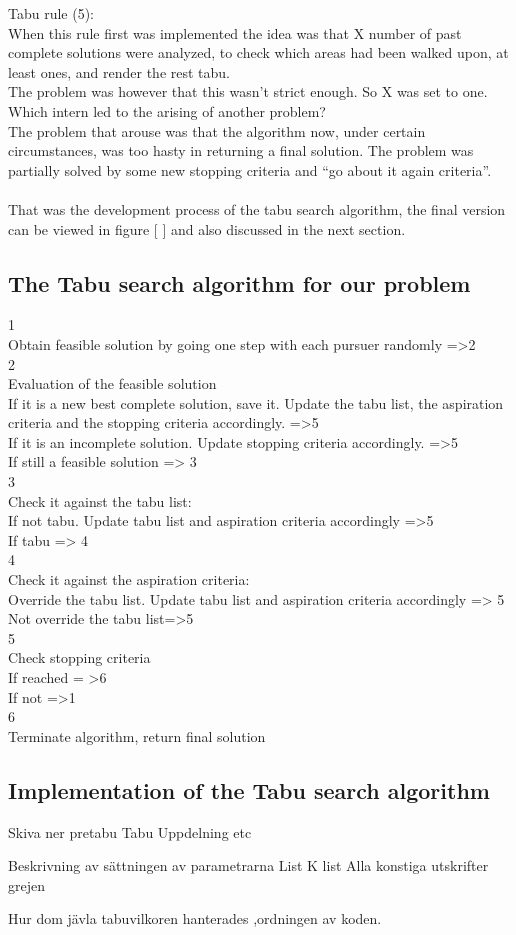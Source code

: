 Tabu rule (5):\\
When this rule first was implemented the idea was that X number of past complete solutions were analyzed, to check which areas had been walked upon, at least ones, and render the rest tabu.\\
The problem was however that this wasn’t strict enough. So X was set to one. Which intern led to the arising of another problem?\\
The problem that arouse was that the algorithm now, under certain circumstances, was too hasty in returning a final solution.
The problem was partially solved by some new stopping criteria and “go about it again criteria”.\\
\\
That was the development process of the tabu search algorithm, the final version can be viewed in figure [ ] and also discussed in the next section.\\


\subsection{The Tabu search algorithm for our problem}


1\\
Obtain feasible solution by going one step with each pursuer randomly =>2\\
2\\
Evaluation of the feasible solution\\
If it is a new best complete solution, save it. Update the tabu list, the aspiration criteria and the stopping criteria accordingly. =>5\\
If it is an incomplete solution. Update stopping criteria accordingly. =>5\\
If still a feasible solution => 3\\
3\\
Check it against the tabu list:\\
If not tabu. Update tabu list and aspiration criteria accordingly =>5\\
If tabu => 4\\
4\\
Check it against the aspiration criteria:\\
Override the tabu list. Update tabu list and aspiration criteria accordingly => 5\\
Not override the tabu list=>5\\
5\\
Check stopping criteria\\
If reached = >6 \\
If not =>1\\
6\\
Terminate algorithm, return final solution\\

\subsection{Implementation of the Tabu search algorithm}


Skiva ner pretabu
Tabu 
Uppdelning etc

Beskrivning av sättningen av parametrarna List K list 
Alla konstiga utskrifter grejen


Hur dom jävla tabuvilkoren hanterades ,ordningen av koden.


